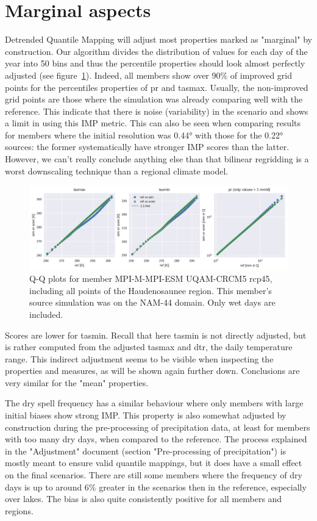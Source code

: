 \documentclass[letterpaper,10pt]{article}
\begin{document}
\section{Marginal aspects}\label{sec:marg}
Detrended Quantile Mapping will adjust most properties marked as "marginal" by construction. Our algorithm divides the distribution of values for each day of the year into 50 bins and thus the percentile properties should look almost perfectly adjusted (see figure~\ref{fig:qq}). Indeed, all members show over 90\% of improved grid points for the percentiles properties of pr and tasmax. Usually, the non-improved grid points are those where the simulation was already comparing well with the reference. This indicate that there is noise (variability) in the scenario and shows a limit in using this IMP metric. This can also be seen when comparing results for members where the initial resolution was 0.44° with those for the 0.22° sources: the former systematically have stronger IMP scores than the latter. However, we can't really conclude anything else than that bilinear regridding is a worst downscaling technique than a regional climate model.

\begin{figure}
\centering
\includegraphics[width=\textwidth]{../images/QQplots.pdf}
\caption{Q-Q plots for member MPI-M-MPI-ESM UQAM-CRCM5 rcp45, including all points of the Haudenosaunee region. This member's source simulation was on the NAM-44 domain. Only wet days are included.}\label{fig:qq}
\end{figure}

Scores are lower for tasmin. Recall that here tasmin is not directly adjusted, but is rather computed from the adjusted tasmax and dtr, the daily temperature range. This indirect adjustment seems to be visible when inspecting the properties and measures, as will be shown again further down. Conclusions are very similar for the "mean" properties.

The dry spell frequency has a similar behaviour where only members with large initial biases show strong IMP. This property is also somewhat adjusted by construction during the pre-processing of precipitation data, at least for members with too many dry days, when compared to the reference. The process explained in the "Adjustment" document (section "Pre-processing of precipitation") is mostly meant to ensure valid quantile mappings, but it does have a small effect on the final scenarios. There are still some members where the frequency of dry days is up to around 6\% greater in the scenarios then in the reference, especially over lakes. The bias is also quite consistently positive for all members and regions.
\end{document}
